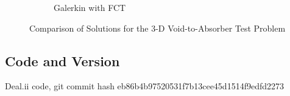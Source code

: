 \begin{figure}[h]
\begin{subfigure}{0.45\textwidth}
      \caption{Galerkin with FCT}
   \end{subfigure}
   \caption{Comparison of Solutions for the 3-D Void-to-Absorber Test Problem}
   \label{fig:void_to_absorber_3D}
\end{figure}
\subsection{Code and Version}
Deal.ii code, git commit hash eb86b4b97520531f7b13cee45d1514f9edfd2273
